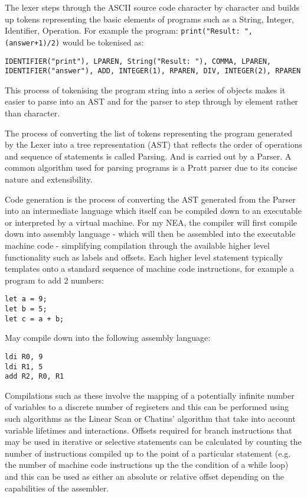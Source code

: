 \bigskip

\bigskip

The lexer steps through the ASCII source code character by character and builds up tokens representing the basic elements of programs such as a String, Integer, Identifier, Operation. For example the program: \texttt{print("Result: ", (answer+1)/2)} would be tokenised as:

\begin{lstlisting}
IDENTIFIER("print"), LPAREN, String("Result: "), COMMA, LPAREN, IDENTIFIER("answer"), ADD, INTEGER(1), RPAREN, DIV, INTEGER(2), RPAREN
\end{lstlisting}

This process of tokenising the program string into a series of objects makes it easier to parse into an AST and for the parser to step through by element rather than character.

The process of converting the list of tokens representing the program generated by the Lexer into a tree representation (AST) that reflects the order of operations and sequence of statements is called Parsing. And is carried out by a Parser. A common algorithm used for parsing programs is a Pratt parser due to its concise nature and extensibility. 

Code generation is the process of converting the AST generated from the Parser into an intermediate language which itself can be compiled down to an executable or interpreted by a virtual machine. For my NEA, the compiler will first compile down into assembly language - which will then be assembled into the executable machine code - simplifying compilation through the available higher level functionality such as labels and offsets. Each higher level statement typically templates onto a standard sequence of machine code instructions, for example a program to add 2 numbers:
\begin{lstlisting}
let a = 9;
let b = 5;
let c = a + b;
\end{lstlisting}

May compile down into the following assembly language:
\begin{lstlisting}
ldi R0, 9
ldi R1, 5
add R2, R0, R1
\end{lstlisting}
Compilations such as these involve the mapping of a potentially infinite number of variables to a discrete number of regiseters and this can be performed using such algorithms as the Linear Scan or Chatins' algorithm \textcite{GFG-linearscan} that take into account variable lifetimes and interactions. Offsets required for branch instructions that may be used in iterative or selective statements can be calculated by counting the number of instructions compiled up to the point of a particular statement (e.g. the number of machine code instructions up the the condition of a while loop) and this can be used as either an absolute or relative offset depending on the capabilities of the assembler.

